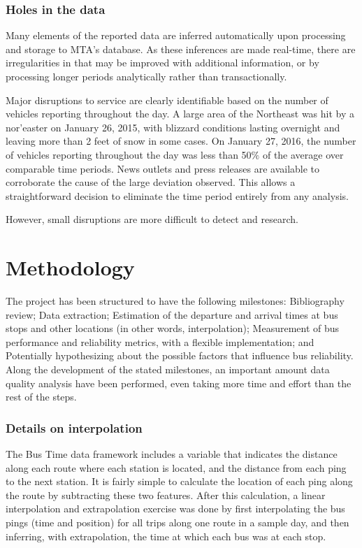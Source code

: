 \documentclass[12pt,journal,compsoc]{IEEEtran}
\begin{document}
\subsubsection{Holes in the data}

Many elements of the reported data are inferred automatically upon processing and storage to MTA’s database.  As these inferences are made real-time, there are irregularities in that may be improved with additional information, or by processing longer periods analytically rather than transactionally.

Major disruptions to service are clearly identifiable based on the number of vehicles reporting throughout the day.  A large area of the Northeast was hit by a nor’easter on January 26, 2015, with blizzard conditions lasting overnight and leaving more than 2 feet of snow in some cases.  On January 27, 2016, the number of vehicles reporting throughout the day was less than 50$\%$ of the average over comparable time periods.  News outlets and press releases are available to corroborate the cause of the large deviation observed.  This allows a straightforward decision to eliminate the time period entirely from any analysis.

However, small disruptions are more difficult to detect and research.

\section{Methodology}

The project has been structured to have the following milestones: Bibliography review; Data extraction; Estimation of the departure and arrival times at bus stops and other locations (in other words, interpolation); Measurement of bus performance and reliability metrics, with a flexible implementation; and Potentially hypothesizing about the possible factors that influence bus reliability. Along the development of the stated milestones, an important amount data quality analysis have been performed, even taking more time and effort than the rest of the steps.

\subsubsection{Details on interpolation}

The Bus Time data framework includes a variable that indicates the distance along each route where each station is located, and the distance from each ping to the next station. It is fairly simple to calculate the location of each ping along the route by subtracting these two features. After this calculation, a linear interpolation and extrapolation exercise was done by first interpolating the bus pings (time and position) for all trips along one route in a sample day, and then inferring, with extrapolation, the time at which each bus was at each stop. 
\end{document}
